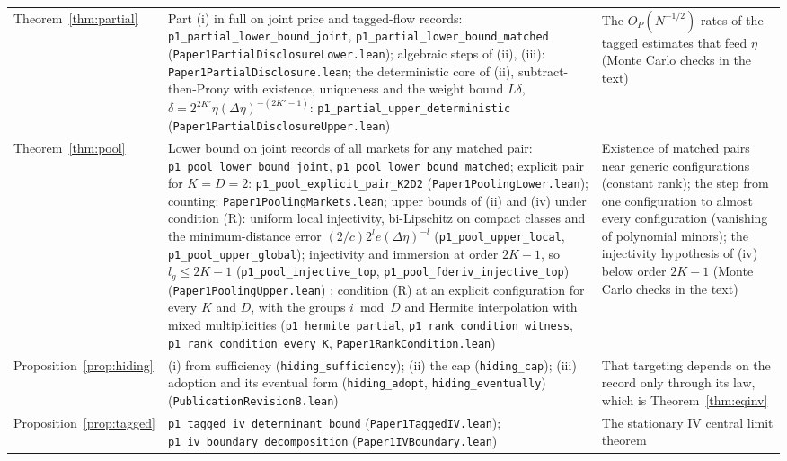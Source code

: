 \documentclass[12pt]{article}
\theoremstyle{definition}
\theoremstyle{remark}
\begin{document}
\begin{longtable}{>{\raggedright\arraybackslash}p{}>{\raggedright\arraybackslash}p{}>{\raggedright\arraybackslash}p{}}
Theorem~\ref{thm:partial} & Part (i) in full on joint price and tagged-flow records: \texttt{p1\_partial\_lower\_bound\_joint}, \texttt{p1\_partial\_lower\_bound\_matched} (\nolinkurl{Paper1PartialDisclosureLower.lean}); algebraic steps of (ii), (iii): \nolinkurl{Paper1PartialDisclosure.lean}; the deterministic core of (ii), subtract-then-Prony with existence, uniqueness and the weight bound $L\delta$, $\delta=2^{2K'}\eta(\Delta\eta)^{-(2K'-1)}$: \texttt{p1\_partial\_upper\_deterministic} (\nolinkurl{Paper1PartialDisclosureUpper.lean}) & The $O_P(N^{-1/2})$ rates of the tagged estimates that feed $\eta$ (Monte Carlo checks in the text)\\
Theorem~\ref{thm:pool} & Lower bound on joint records of all markets for any matched pair: \texttt{p1\_pool\_lower\_bound\_joint}, \texttt{p1\_pool\_lower\_bound\_matched}; explicit pair for $K=D=2$: \texttt{p1\_pool\_explicit\_pair\_K2D2} (\nolinkurl{Paper1PoolingLower.lean}); counting: \nolinkurl{Paper1PoolingMarkets.lean}; upper bounds of (ii) and (iv) under condition (R): uniform local injectivity, bi-Lipschitz on compact classes and the minimum-distance error $(2/c)2^l e(\Delta\eta)^{-l}$ (\texttt{p1\_pool\_upper\_local}, \texttt{p1\_pool\_upper\_global}); injectivity and immersion at order $2K-1$, so $l_g\le2K-1$ (\texttt{p1\_pool\_injective\_top}, \texttt{p1\_pool\_fderiv\_injective\_top}) (\nolinkurl{Paper1PoolingUpper.lean}) ; condition (R) at an explicit configuration for every $K$ and $D$, with the groups $i\bmod D$ and Hermite interpolation with mixed multiplicities (\texttt{p1\_hermite\_partial}, \texttt{p1\_rank\_condition\_witness}, \texttt{p1\_rank\_condition\_every\_K}, \nolinkurl{Paper1RankCondition.lean}) & Existence of matched pairs near generic configurations (constant rank); the step from one configuration to almost every configuration (vanishing of polynomial minors); the injectivity hypothesis of (iv) below order $2K-1$ (Monte Carlo checks in the text)\\
Proposition~\ref{prop:hiding} & (i) from sufficiency (\texttt{hiding\_sufficiency}); (ii) the cap (\texttt{hiding\_cap}); (iii) adoption and its eventual form (\texttt{hiding\_adopt}, \texttt{hiding\_eventually}) (\nolinkurl{PublicationRevision8.lean}) & That targeting depends on the record only through its law, which is Theorem~\ref{thm:eqinv}\\
Proposition~\ref{prop:tagged} & \texttt{p1\_tagged\_iv\_determinant\_bound} (\nolinkurl{Paper1TaggedIV.lean}); \texttt{p1\_iv\_boundary\_decomposition} (\nolinkurl{Paper1IVBoundary.lean}) & The stationary IV central limit theorem\\

\end{longtable}
\end{document}
